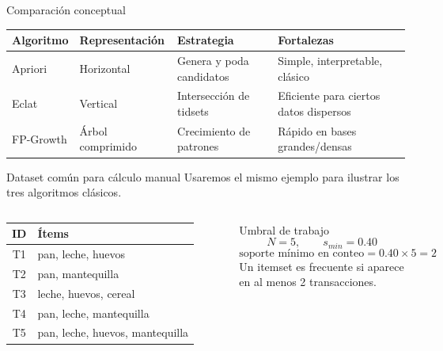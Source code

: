 \documentclass[10pt,aspectratio=169]{beamer}
\begin{document}
\begin{frame}{Comparación conceptual}
\begin{table}
\centering
\begin{tabular}{p{}p{}p{}p{}}
\toprule
Algoritmo & Representación & Estrategia & Fortalezas \\
\midrule
Apriori & Horizontal & Genera y poda candidatos & Simple, interpretable, clásico \\
Eclat & Vertical & Intersección de tidsets & Eficiente para ciertos datos dispersos \\
FP-Growth & Árbol comprimido & Crecimiento de patrones & Rápido en bases grandes/densas \\
\bottomrule
\end{tabular}
\end{table}
\end{frame}


\begin{frame}{Dataset común para cálculo manual}
\small
Usaremos el mismo ejemplo para ilustrar los tres algoritmos clásicos.

\vspace{0.15cm}
\begin{columns}[T]
\begin{table}
\centering
\scriptsize
\begin{tabular}{cl}
\toprule
ID & Ítems \\
\midrule
T1 & pan, leche, huevos \\
T2 & pan, mantequilla \\
T3 & leche, huevos, cereal \\
T4 & pan, leche, mantequilla \\
T5 & pan, leche, huevos, mantequilla \\
\bottomrule
\end{tabular}
\end{table}

\begin{block}{Umbral de trabajo}
\[
N=5, \qquad s_{min}=0.40
\]
\[
\text{soporte mínimo en conteo}=0.40 \times 5=2
\]
Un itemset es frecuente si aparece en al menos 2 transacciones.
\end{block}
\end{columns}
\end{frame}


\end{document}
